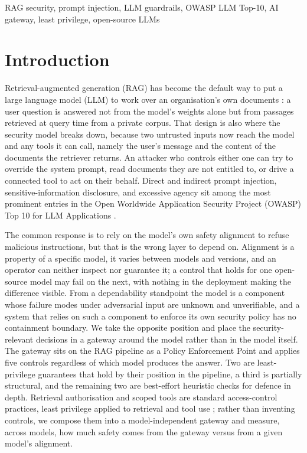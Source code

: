\documentclass[conference]{IEEEtran}
\begin{document}
\begin{IEEEkeywords}
RAG security, prompt injection, LLM guardrails, OWASP LLM Top-10, AI gateway,
least privilege, open-source LLMs
\end{IEEEkeywords}

\section{Introduction}
\label{sec:intro}

Retrieval-augmented generation (RAG) has become the default way to put a large
language model (LLM) to work over an organisation's own documents
\cite{lewis2020rag}: a user question is answered not from the model's weights
alone but from passages retrieved at query time from a private corpus. That design
is also where the security model breaks down, because two untrusted inputs now
reach the model and any tools it can call, namely the user's message and the
content of the documents the retriever returns. An attacker who controls either
one can try to override the system prompt, read documents they are not entitled
to, or drive a connected tool to act on their behalf. Direct and indirect prompt
injection, sensitive-information disclosure, and excessive agency sit among the
most prominent entries in the Open Worldwide Application Security Project (OWASP) Top 10 for LLM Applications
\cite{owasp2025llmtop10,greshake2023indirect,perez2022ignore}.

The common response is to rely on the model's own safety alignment to refuse
malicious instructions, but that is the wrong layer to depend on. Alignment is a
property of a specific model, it varies between models and versions, and an
operator can neither inspect nor guarantee it; a control that holds for one
open-source model may fail on the next, with nothing in the deployment making the
difference visible. From a dependability standpoint the model is a component whose
failure modes under adversarial input are unknown and unverifiable, and a system that
relies on such a component to enforce its own security policy has no containment
boundary. We take the opposite position and place the security-relevant decisions in
a gateway around the model rather than in the model itself. The gateway sits on the
RAG pipeline as a Policy Enforcement Point and applies five controls regardless of
which model produces the answer. Two are least-privilege guarantees that hold by
their position in the pipeline, a third is partially structural, and the remaining
two are best-effort heuristic checks for defence in depth. Retrieval authorisation
and scoped tools are standard access-control practices, least privilege applied to
retrieval and tool use \cite{saltzer1975protection}; rather than inventing controls,
we compose them into a model-independent gateway and measure, across models, how
much safety comes from the gateway versus from a given model's alignment.
\end{document}
